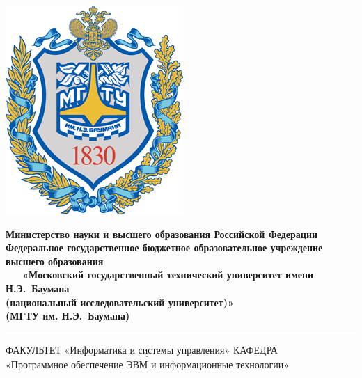 \begin{titlepage}
	\noindent \begin{minipage}{0.15\textwidth}
	\includegraphics[width=\linewidth]{bmstu_logo}
	\end{minipage}
	\noindent\begin{minipage}{0.9\textwidth}\centering
		\textbf{Министерство науки и высшего образования Российской Федерации}\\
		\textbf{Федеральное государственное бюджетное образовательное учреждение высшего образования}\\
		\textbf{~~~«Московский государственный технический университет имени Н.Э.~Баумана}\\
		\textbf{(национальный исследовательский университет)»}\\
		\textbf{(МГТУ им. Н.Э.~Баумана)}
	\end{minipage}
	
	\noindent\rule{18cm}{3pt}
	\newline\newline
	\noindent ФАКУЛЬТЕТ $\underline{\text{«Информатика и системы управления»}}$ \newline\newline
	\noindent КАФЕДРА $\underline{\text{«Программное обеспечение ЭВМ и информационные технологии»}}$\newline\newline\newline\newline\newline
	

\end{titlepage}
